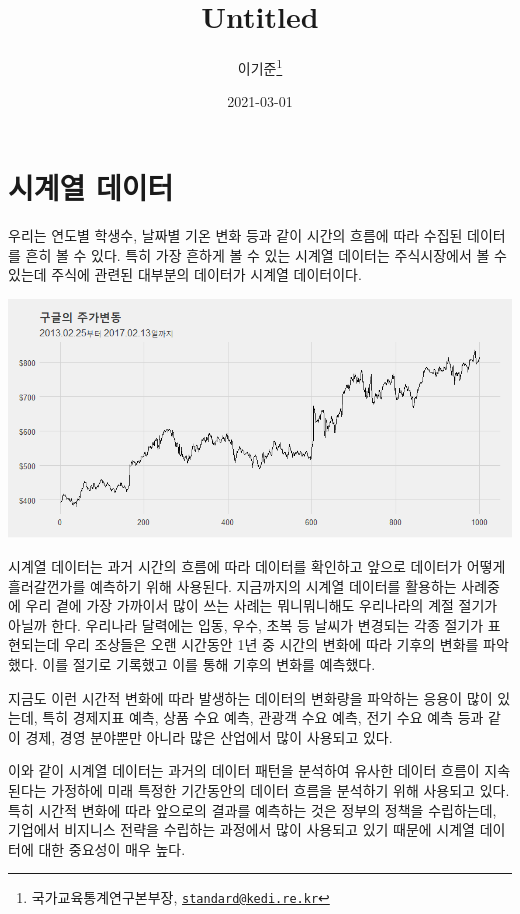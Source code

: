 \documentclass[
]{book}
\title{Untitled}
\author{이기준\footnote{국가교육통계연구본부장, \href{mailto:standard@kedi.re.kr}{\nolinkurl{standard@kedi.re.kr}}}}
\date{2021-03-01}
\begin{document}
\maketitle

{
\setcounter{tocdepth}{1}
\tableofcontents
}
\hypertarget{uxc2dcuxacc4uxc5f4-uxb370uxc774uxd130}{%
\chapter{시계열 데이터}\label{uxc2dcuxacc4uxc5f4-uxb370uxc774uxd130}}

우리는 연도별 학생수, 날짜별 기온 변화 등과 같이 시간의 흐름에 따라 수집된 데이터를 흔히 볼 수 있다. 특히 가장 흔하게 볼 수 있는 시계열 데이터는 주식시장에서 볼 수 있는데 주식에 관련된 대부분의 데이터가 시계열 데이터이다.

\includegraphics{goog.png}

시계열 데이터는 과거 시간의 흐름에 따라 데이터를 확인하고 앞으로 데이터가 어떻게 흘러갈껀가를 예측하기 위해 사용된다. 지금까지의 시계열 데이터를 활용하는 사례중에 우리 곁에 가장 가까이서 많이 쓰는 사례는 뭐니뭐니해도 우리나라의 계절 절기가 아닐까 한다. 우리나라 달력에는 입동, 우수, 초복 등 날씨가 변경되는 각종 절기가 표현되는데 우리 조상들은 오랜 시간동안 1년 중 시간의 변화에 따라 기후의 변화를 파악했다. 이를 절기로 기록했고 이를 통해 기후의 변화를 예측했다.

지금도 이런 시간적 변화에 따라 발생하는 데이터의 변화량을 파악하는 응용이 많이 있는데, 특히 경제지표 예측, 상품 수요 예측, 관광객 수요 예측, 전기 수요 예측 등과 같이 경제, 경영 분야뿐만 아니라 많은 산업에서 많이 사용되고 있다.

이와 같이 시계열 데이터는 과거의 데이터 패턴을 분석하여 유사한 데이터 흐름이 지속된다는 가정하에 미래 특정한 기간동안의 데이터 흐름을 분석하기 위해 사용되고 있다. 특히 시간적 변화에 따라 앞으로의 결과를 예측하는 것은 정부의 정책을 수립하는데, 기업에서 비지니스 전략을 수립하는 과정에서 많이 사용되고 있기 때문에 시계열 데이터에 대한 중요성이 매우 높다.
\end{document}
